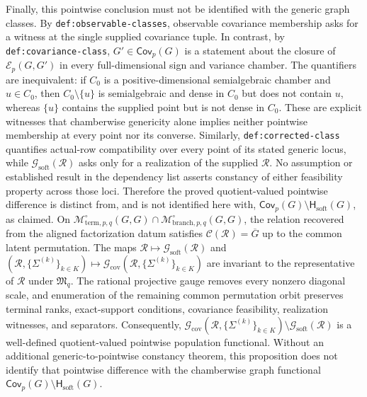 Finally, this pointwise conclusion must not be identified with the generic graph
classes.  By \texttt{def:observable-classes}, observable covariance membership
asks for a witness at the single supplied covariance tuple.  In contrast, by
\texttt{def:covariance-class}, \(G'\in\mathsf{Cov}_p(G)\) is a statement about
the closure of \(\mathcal E_p(G,G')\) in every full-dimensional sign and variance
chamber.  The quantifiers are inequivalent: if \(C_0\) is a positive-dimensional
semialgebraic chamber and \(u\in C_0\), then
\(C_0\setminus\{u\}\) is semialgebraic and dense in \(C_0\) but does not contain
\(u\), whereas \(\{u\}\) contains the supplied point but is not dense in
\(C_0\).  These are explicit witnesses that chamberwise genericity alone implies
neither pointwise membership at every point nor its converse.  Similarly,
\texttt{def:corrected-class} quantifies actual-row compatibility over every point
of its stated generic locus, while \(\mathcal G_{\mathrm{soft}}(\mathcal R)\)
asks only for a realization of the supplied \(\mathcal R\).  No assumption or
established result in the dependency list asserts constancy of either feasibility
property across those loci.  Therefore the proved quotient-valued pointwise
difference is distinct from, and is not identified here with,
\(\mathsf{Cov}_p(G)\setminus\mathsf H_{\mathrm{soft}}(G)\), as claimed.
On \(\mathcal M^{\circ}_{\mathrm{term},p,q}(G,G)\cap\mathcal M^{\circ}_{\mathrm{branch},p,q}(G,G)\), the relation recovered from the aligned factorization datum satisfies \(\mathcal C(\mathcal R)=\overline G\) up to the common latent permutation.  The maps \(\mathcal R\mapsto\mathcal G_{\mathrm{soft}}(\mathcal R)\) and \((\mathcal R,\{\Sigma^{(k)}\}_{k\in K})\mapsto\mathcal G_{\mathrm{cov}}(\mathcal R,\{\Sigma^{(k)}\}_{k\in K})\) are invariant to the representative of \(\mathcal R\) under \(\mathfrak M_q\).  The rational projective gauge removes every nonzero diagonal scale, and enumeration of the remaining common permutation orbit preserves terminal ranks, exact-support conditions, covariance feasibility, realization witnesses, and separators.  Consequently, \(\mathcal G_{\mathrm{cov}}(\mathcal R,\{\Sigma^{(k)}\}_{k\in K})\setminus\mathcal G_{\mathrm{soft}}(\mathcal R)\) is a well-defined quotient-valued pointwise population functional.  Without an additional generic-to-pointwise constancy theorem, this proposition does not identify that pointwise difference with the chamberwise graph functional \(\mathsf{Cov}_p(G)\setminus\mathsf H_{\mathrm{soft}}(G)\).
